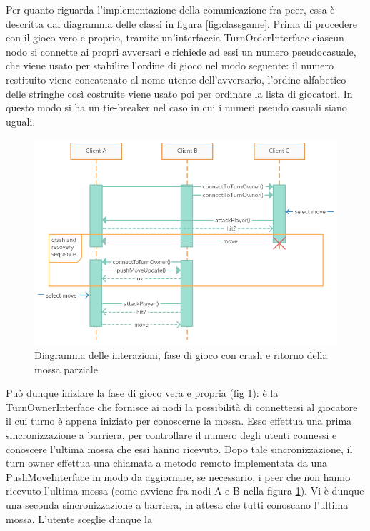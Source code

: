 Per quanto riguarda l'implementazione della comunicazione fra peer, essa è descritta dal
diagramma delle classi in figura \ref{fig:classgame}.
Prima di procedere con il gioco vero e proprio, tramite un'interfaccia 
TurnOrderInterface ciascun nodo si connette ai propri avversari e richiede ad 
essi un numero pseudocasuale, che viene usato per stabilire l'ordine di gioco 
nel modo seguente: il numero restituito viene concatenato al nome utente 
dell'avversario, l'ordine alfabetico delle stringhe così costruite viene usato 
poi per ordinare la lista di giocatori. In questo modo si ha un tie-breaker nel 
caso in cui i numeri pseudo casuali siano uguali.
\\
\begin{figure}[!ht]
    \centering
    \includegraphics[scale=0.55,center]{core/imgs/UML/sequence/game.png}
    \caption{Diagramma delle interazioni, fase di gioco con crash e ritorno 
della mossa parziale}
    \label{fig:gameseq}
\end{figure}
Può dunque iniziare la fase di gioco vera e propria (fig \ref{fig:gameseq}): è 
la TurnOwnerInterface 
che fornisce ai nodi la possibilità di connettersi al giocatore il cui turno 
è appena iniziato per conoscerne la mossa. Esso effettua una prima 
sincronizzazione a barriera, per controllare il numero degli utenti connessi e 
conoscere l'ultima mossa che essi hanno ricevuto. Dopo tale sincronizzazione, 
il turn owner effettua una chiamata a metodo remoto implementata da una 
PushMoveInterface in modo da aggiornare, se necessario, i peer che non hanno 
ricevuto l'ultima mossa (come avviene fra nodi A e B nella figura 
\ref{fig:gameseq}). Vi è dunque una seconda sincronizzazione a barriera, 
in attesa che tutti conoscano l'ultima mossa. L'utente sceglie dunque la 
